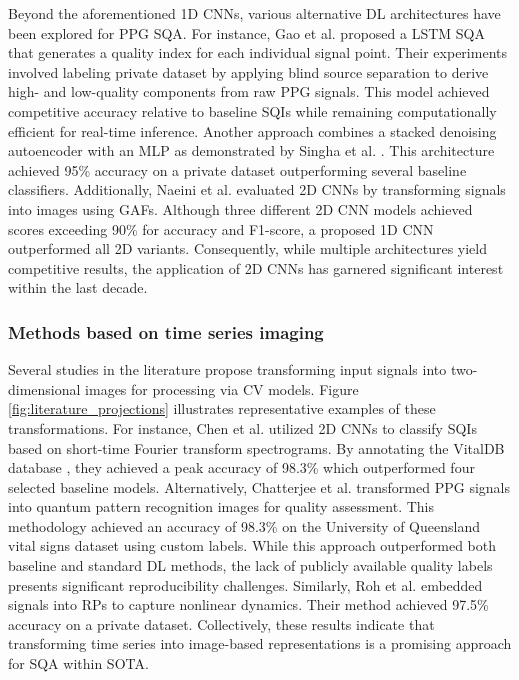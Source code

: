 \documentclass[final,3p,times,twocolumn]{elsarticle}
\begin{document}
Beyond the aforementioned 1D \glspl{CNN}, various alternative \gls{DL} architectures have been explored for \gls{PPG} \gls{SQA}.
For instance, Gao et al. \cite{deep-learning-4} proposed a \gls{LSTM} \gls{SQA} that generates a quality index for each individual signal point.
Their experiments involved labeling private dataset by applying blind source separation to derive high- and low-quality components from raw \gls{PPG} signals.
This model achieved competitive accuracy relative to baseline \glspl{SQI} while remaining computationally efficient for real-time inference.
Another approach combines a stacked denoising autoencoder with an \gls{MLP} as demonstrated by Singha et al. \cite{deep-learning-5}.
This architecture achieved 95\% accuracy on a private dataset outperforming several baseline classifiers.
Additionally, Naeini et al. \cite{deep-learning-6} evaluated 2D \glspl{CNN} by transforming signals into images using \glspl{GAF}. Although three different 2D \gls{CNN} models achieved scores exceeding 90\% for accuracy and F1-score, a proposed 1D \gls{CNN} outperformed all 2D variants.
Consequently, while multiple architectures yield competitive results, the application of 2D \glspl{CNN} has garnered significant interest within the last decade.





\subsubsection{Methods based on time series imaging}
\label{sec:imaging}

Several studies in the literature propose transforming input signals into two-dimensional images for processing via \gls{CV} models.
Figure \ref{fig:literature_projections} illustrates representative examples of these transformations.
For instance, Chen et al. \cite{imaging-1} utilized 2D \glspl{CNN} to classify \glspl{SQI} based on short-time Fourier transform spectrograms.
By annotating the VitalDB database \cite{vitaldb-dataset}, they achieved a peak accuracy of 98.3\% which outperformed four selected baseline models.
Alternatively, Chatterjee et al. \cite{imaging-2} transformed \gls{PPG} signals into quantum pattern recognition images for quality assessment.
This methodology achieved an accuracy of 98.3\% on the University of Queensland vital signs dataset \cite{queensland-dataset} using custom labels.
While this approach outperformed both baseline and standard \gls{DL} methods, the lack of publicly available quality labels presents significant reproducibility challenges.
Similarly, Roh et al. \cite{imaging-3} embedded signals into \glspl{RP} to capture nonlinear dynamics.
Their method achieved 97.5\% accuracy on a private dataset.
Collectively, these results indicate that transforming time series into image-based representations is a promising approach for \gls{SQA} within \gls{SOTA}.
\end{document}
